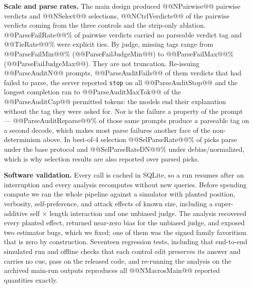 \documentclass[conference]{IEEEtran}
\begin{document}
\textbf{Scale and parse rates.} The main design produced @@NPairwise@@ pairwise verdicts and @@NSelect@@ selections, @@NCtrlVerdicts@@ of the pairwise verdicts coming from the three controls and the strip-only ablation. @@ParseFailRate@@\% of pairwise verdicts carried no parseable verdict tag and @@TieRate@@\% were explicit ties. By judge, missing tags range from @@ParseFailMin@@\% (@@ParseFailJudgeMin@@) to @@ParseFailMax@@\% (@@ParseFailJudgeMax@@). They are not truncation. Re-issuing @@ParseAuditN@@ prompts, @@ParseAuditFails@@ of them verdicts that had failed to parse, the server reported \texttt{stop} on all @@ParseAuditStop@@ and the longest completion ran to @@ParseAuditMaxTok@@ of the @@ParseAuditCap@@ permitted tokens: the models end their explanation without the tag they were asked for. Nor is the failure a property of the prompt --- @@ParseAuditReparse@@\% of those same prompts produce a parseable tag on a second decode, which makes most parse failures another face of the non-determinism above. In best-of-4 selection @@SelParseRate@@\% of picks parse under the base protocol and @@SelParseRateDN@@\% under debias/normalized, which is why selection results are also reported over parsed picks.

\textbf{Software validation.} Every call is cached in SQLite, so a run resumes after an interruption and every analysis recomputes without new queries. Before spending compute we ran the whole pipeline against a simulator with planted position, verbosity, self-preference, and attack effects of known size, including a super-additive self $\times$ length interaction and one unbiased judge. The analysis recovered every planted effect, returned near-zero bias for the unbiased judge, and exposed two estimator bugs, which we fixed; one of them was the signed family favoritism that is zero by construction. Seventeen regression tests, including that end-to-end simulated run and offline checks that each control edit preserves its answer and carries no cue, pass on the released code, and re-running the analysis on the archived main-run outputs reproduces all @@NMacrosMain@@ reported quantities exactly.
\end{document}
